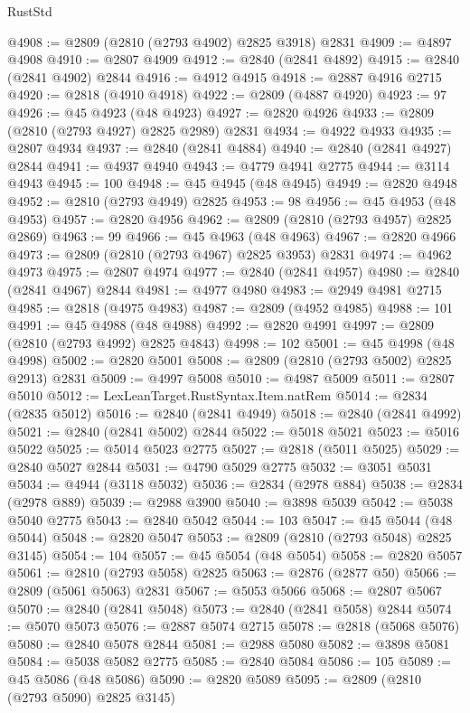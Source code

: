 \begin{lexlean}{RustStd}
\begin{coremodule}
{\begin{coremodule}
{{{{{{{{{{{{{{{{{{{{{{{{{{{{{{{{{@4908 := @2809 (@2810 (@2793 @4902) @2825 @3918) @2831
@4909 := @4897 @4908
@4910 := @2807 @4909
@4912 := @2840 (@2841 @4892)
@4915 := @2840 (@2841 @4902) @2844
@4916 := @4912 @4915
@4918 := @2887 @4916 @2715
@4920 := @2818 (@4910 @4918)
@4922 := @2809 (@4887 @4920)
@4923 := 97
@4926 := @45 @4923 (@48 @4923)
@4927 := @2820 @4926
@4933 := @2809 (@2810 (@2793 @4927) @2825 @2989) @2831
@4934 := @4922 @4933
@4935 := @2807 @4934
@4937 := @2840 (@2841 @4884)
@4940 := @2840 (@2841 @4927) @2844
@4941 := @4937 @4940
@4943 := @4779 @4941 @2775
@4944 := @3114 @4943
@4945 := 100
@4948 := @45 @4945 (@48 @4945)
@4949 := @2820 @4948
@4952 := @2810 (@2793 @4949) @2825
@4953 := 98
@4956 := @45 @4953 (@48 @4953)
@4957 := @2820 @4956
@4962 := @2809 (@2810 (@2793 @4957) @2825 @2869)
@4963 := 99
@4966 := @45 @4963 (@48 @4963)
@4967 := @2820 @4966
@4973 := @2809 (@2810 (@2793 @4967) @2825 @3953) @2831
@4974 := @4962 @4973
@4975 := @2807 @4974
@4977 := @2840 (@2841 @4957)
@4980 := @2840 (@2841 @4967) @2844
@4981 := @4977 @4980
@4983 := @2949 @4981 @2715
@4985 := @2818 (@4975 @4983)
@4987 := @2809 (@4952 @4985)
@4988 := 101
@4991 := @45 @4988 (@48 @4988)
@4992 := @2820 @4991
@4997 := @2809 (@2810 (@2793 @4992) @2825 @4843)
@4998 := 102
@5001 := @45 @4998 (@48 @4998)
@5002 := @2820 @5001
@5008 := @2809 (@2810 (@2793 @5002) @2825 @2913) @2831
@5009 := @4997 @5008
@5010 := @4987 @5009
@5011 := @2807 @5010
@5012 := LexLeanTarget.RustSyntax.Item.natRem
@5014 := @2834 (@2835 @5012)
@5016 := @2840 (@2841 @4949)
@5018 := @2840 (@2841 @4992)
@5021 := @2840 (@2841 @5002) @2844
@5022 := @5018 @5021
@5023 := @5016 @5022
@5025 := @5014 @5023 @2775
@5027 := @2818 (@5011 @5025)
@5029 := @2840 @5027 @2844
@5031 := @4790 @5029 @2775
@5032 := @3051 @5031
@5034 := @4944 (@3118 @5032)
@5036 := @2834 (@2978 @884)
@5038 := @2834 (@2978 @889)
@5039 := @2988 @3900
@5040 := @3898 @5039
@5042 := @5038 @5040 @2775
@5043 := @2840 @5042
@5044 := 103
@5047 := @45 @5044 (@48 @5044)
@5048 := @2820 @5047
@5053 := @2809 (@2810 (@2793 @5048) @2825 @3145)
@5054 := 104
@5057 := @45 @5054 (@48 @5054)
@5058 := @2820 @5057
@5061 := @2810 (@2793 @5058) @2825
@5063 := @2876 (@2877 @50)
@5066 := @2809 (@5061 @5063) @2831
@5067 := @5053 @5066
@5068 := @2807 @5067
@5070 := @2840 (@2841 @5048)
@5073 := @2840 (@2841 @5058) @2844
@5074 := @5070 @5073
@5076 := @2887 @5074 @2715
@5078 := @2818 (@5068 @5076)
@5080 := @2840 @5078 @2844
@5081 := @2988 @5080
@5082 := @3898 @5081
@5084 := @5038 @5082 @2775
@5085 := @2840 @5084
@5086 := 105
@5089 := @45 @5086 (@48 @5086)
@5090 := @2820 @5089
@5095 := @2809 (@2810 (@2793 @5090) @2825 @3145)
}}}}}}}}}}}}}}}}}}}}}}}}}}}}}}}}}
\end{coremodule}}
\end{coremodule}
\end{lexlean}

